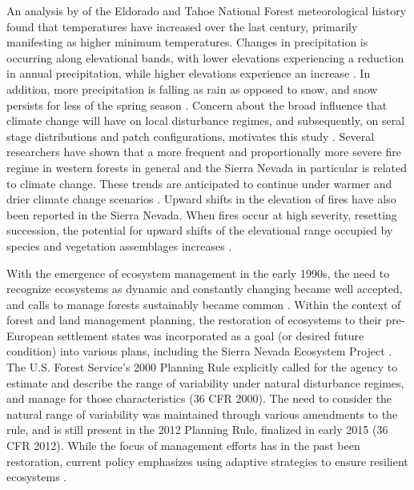 An analysis by \citep{Mallek2014} of the Eldorado and Tahoe National Forest meteorological history found that temperatures have increased over the last century, primarily manifesting as higher minimum temperatures. Changes in precipitation is occurring along elevational bands, with lower elevations experiencing a reduction in annual precipitation, while higher elevations experience an increase \citep{Mallek2014}. In addition, more precipitation is falling as rain as opposed to snow, and snow persists for less of the spring season \citep{Mallek2014}. Concern about the broad influence that climate change will have on local disturbance regimes, and subsequently, on seral stage distributions and patch configurations, motivates this study \citep{Fule2008,North2012}. Several researchers have shown that a more frequent and proportionally more severe fire regime in western forests in general and the Sierra Nevada in particular \citep{McKenzie2004,Westerling2011,Miller2012} is related to climate change. These trends are anticipated to continue under warmer and drier climate change scenarios \citep{Dale2001,Cook2004,Westerling2006, Westerling2008}. Upward shifts in the elevation of fires have also been reported in the Sierra Nevada\citep{Schwartz2015}. When fires occur at high severity, resetting succession, the potential for upward shifts of the elevational range occupied by species and vegetation assemblages increases \citep{Schwartz2015}. 

With the emergence of ecosystem management in the early 1990s, the need to recognize ecosystems as dynamic and constantly changing became well accepted, and calls to manage forests sustainably became common \citep{Christensen1996}. Within the context of forest and land management planning, the restoration of ecosystems to their pre-European settlement states was incorporated as a goal (or desired future condition) into various plans, including the Sierra Nevada Ecosystem Project \citep{SNEP1996a}. The U.S. Forest Service's 2000 Planning Rule explicitly called for the agency to estimate and describe the range of variability under natural disturbance regimes, and manage for those characteristics (36 CFR  2000). The need to consider the natural range of variability was maintained through various amendments to the rule, and is still present in the 2012 Planning Rule, finalized in early 2015 (36 CFR  2012). While the focus of management efforts has in the past been restoration, current policy emphasizes using adaptive strategies to ensure resilient ecosystems \citep{Stephens2010}.

